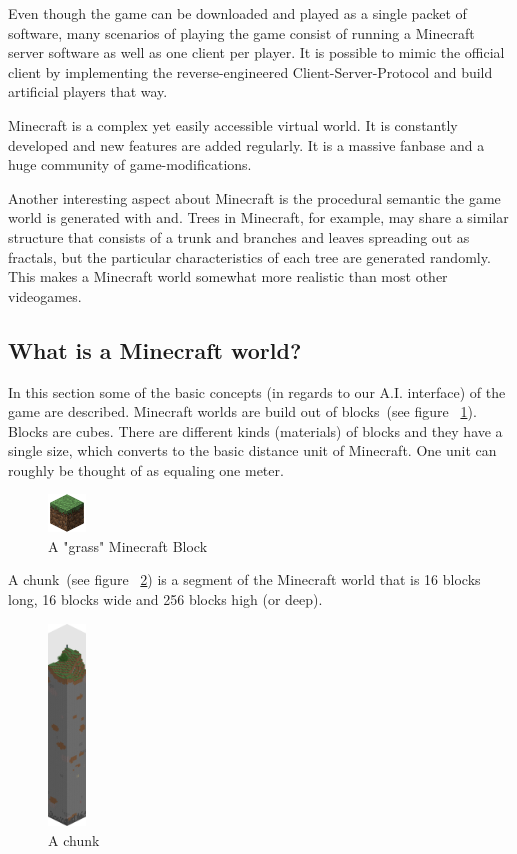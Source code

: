 Even though the game can be downloaded and played as a single packet of software, many scenarios of playing the game consist of running a Minecraft server software as well as one client per player. It is possible to mimic the official client by implementing the reverse-engineered Client-Server-Protocol and build artificial players that way.

Minecraft is a complex yet easily accessible virtual world. It is constantly developed and new features are added regularly. It is a massive fanbase and a huge community of game-modifications.

Another interesting aspect about Minecraft is the procedural semantic the game world is generated with and. Trees in Minecraft, for example, may share a similar structure that consists of a trunk and branches and leaves spreading out as fractals, but the particular characteristics of each tree are generated randomly. This makes a Minecraft world somewhat more realistic than most other videogames.

        \subsection{What is a Minecraft world?}
In this section some of the basic concepts (in regards to our A.I. interface) of the game are described. Minecraft worlds are build out of blocks~(see figure ~\ref{mc_block}). Blocks are cubes. There are different kinds (materials) of blocks and they have a single size, which converts to the basic distance unit of Minecraft. One unit can roughly be thought of as equaling one meter.

\begin{figure}[h]
  \centering
    \includegraphics[width=1cm]{graphics/block}
  \caption{A "grass" Minecraft Block}
  \label{mc_block}
\end{figure}
        
A chunk~(see figure ~\ref{mc_chunk}) is a segment of the Minecraft world that is 16 blocks long, 16 blocks wide and 256 blocks high (or deep).~\cite{mcwiki_chunks}

\begin{figure}[h]
  \centering
    \includegraphics[width=1cm]{graphics/chunk}
  \caption{A chunk}
  \label{mc_chunk}
\end{figure}

